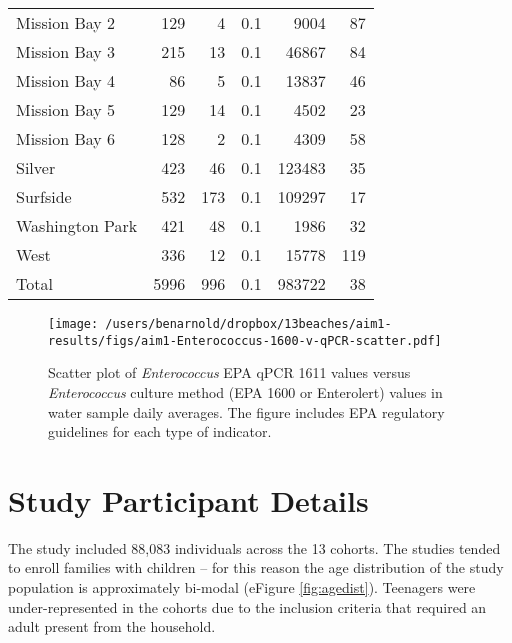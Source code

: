 \documentclass[12pt]{article}\usepackage[]{graphicx}\usepackage[]{color}
\begin{document}
\begin{table}[h!tb]
\begin{center}
\begin{tabular}{l rrrrr}
  Mission Bay 2 & 129 & 4 & 0.1 & 9004 & 87 \\ 
  Mission Bay 3 & 215 & 13 & 0.1 & 46867 & 84 \\ 
  Mission Bay 4 & 86 & 5 & 0.1 & 13837 & 46 \\ 
  Mission Bay 5 & 129 & 14 & 0.1 & 4502 & 23 \\ 
  Mission Bay 6 & 128 & 2 & 0.1 & 4309 & 58 \\ 
  Silver & 423 & 46 & 0.1 & 123483 & 35 \\ 
  Surfside & 532 & 173 & 0.1 & 109297 & 17 \\ 
  Washington Park & 421 & 48 & 0.1 & 1986 & 32 \\ 
  West & 336 & 12 & 0.1 & 15778 & 119 \\ 
  
\hline
 Total & 5996 & 996 & 0.1 & 983722 & 38 \\ 
  
\hline
\end{tabular}
\end{center}
\end{table}



\clearpage
\begin{figure}
\begin{center}
\texttt{[image: /users/benarnold/dropbox/13beaches/aim1-results/figs/aim1-Enterococcus-1600-v-qPCR-scatter.pdf]}
\caption{Scatter plot of \emph{Enterococcus} EPA qPCR 1611 values versus \emph{Enterococcus} culture method (EPA 1600 or Enterolert) values in water sample daily averages. The figure includes EPA regulatory guidelines for each type of indicator.
 \label{fig:entero1600v1611}}
\end{center}
\end{figure}

\clearpage
\section{Study Participant Details}

The study included 88,083 individuals across the 13 cohorts. The studies tended to enroll families with children  -- for this reason the age distribution of the study population is approximately bi-modal (eFigure \ref{fig:agedist}). Teenagers were under-represented in the cohorts due to the inclusion criteria that required an adult present from the household. 
\end{document}
